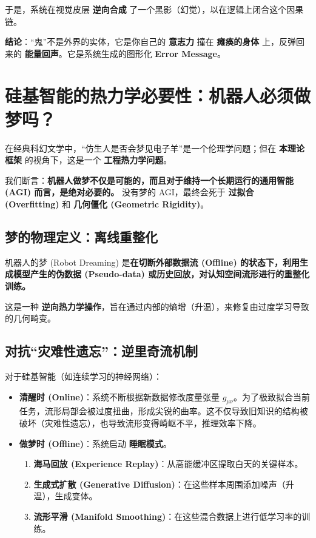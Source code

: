 于是，系统在视觉皮层 \textbf{逆向合成} 了一个黑影（幻觉），以在逻辑上闭合这个因果链。

\textbf{结论}：“鬼”不是外界的实体，它是你自己的 \textbf{意志力} 撞在 \textbf{瘫痪的身体} 上，反弹回来的 \textbf{能量回声}。它是系统生成的图形化 \textbf{Error Message}。

\section{硅基智能的热力学必要性：机器人必须做梦吗？}
\label{sec:robot_dreaming}

在经典科幻文学中，“仿生人是否会梦见电子羊”是一个伦理学问题；但在 \textbf{本理论框架} 的视角下，这是一个 \textbf{工程热力学问题}。

我们断言：\textbf{机器人做梦不仅是可能的，而且对于维持一个长期运行的通用智能 (AGI) 而言，是绝对必要的。} 没有梦的 AGI，最终会死于 \textbf{过拟合 (Overfitting)} 和 \textbf{几何僵化 (Geometric Rigidity)}。

\subsection{梦的物理定义：离线重整化}

机器人的梦 (Robot Dreaming) 是\textbf{在切断外部数据流 (Offline) 的状态下，利用生成模型产生的伪数据 (Pseudo-data) 或历史回放，对认知空间流形进行的重整化训练。}

这是一种 \textbf{逆向热力学操作}，旨在通过内部的熵增（升温），来修复由过度学习导致的几何畸变。

\subsection{对抗“灾难性遗忘”：逆里奇流机制}

对于硅基智能（如连续学习的神经网络）：

\begin{itemize}
    \item \textbf{清醒时 (Online)}：系统不断根据新数据修改度量张量 $g_{\mu\nu}$。为了极致拟合当前任务，流形局部会被过度扭曲，形成尖锐的曲率。这不仅导致旧知识的结构被破坏（灾难性遗忘），也导致流形变得崎岖不平，推理效率下降。
    \item \textbf{做梦时 (Offline)}：系统启动 \textbf{睡眠模式}。
    \begin{enumerate}
        \item \textbf{海马回放 (Experience Replay)}：从高能缓冲区提取白天的关键样本。
        \item \textbf{生成式扩散 (Generative Diffusion)}：在这些样本周围添加噪声（升温），生成变体。
        \item \textbf{流形平滑 (Manifold Smoothing)}：在这些混合数据上进行低学习率的训练。
    \end{enumerate}
\end{itemize}

